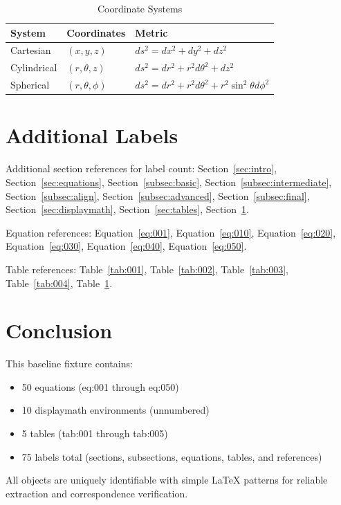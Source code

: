 \documentclass{article}
\begin{document}
\begin{table}[h]
\centering
\caption{Coordinate Systems}\label{tab:005}
\begin{tabular}{lll}
\hline
System & Coordinates & Metric \\
\hline
Cartesian & $(x, y, z)$ & $ds^2 = dx^2 + dy^2 + dz^2$ \\
Cylindrical & $(r, \theta, z)$ & $ds^2 = dr^2 + r^2d\theta^2 + dz^2$ \\
Spherical & $(r, \theta, \phi)$ & $ds^2 = dr^2 + r^2d\theta^2 + r^2\sin^2\theta d\phi^2$ \\
\hline
\end{tabular}
\end{table}

\section{Additional Labels}\label{sec:labels}

Additional section references for label count: Section~\ref{sec:intro}, Section~\ref{sec:equations}, Section~\ref{subsec:basic}, Section~\ref{subsec:intermediate}, Section~\ref{subsec:align}, Section~\ref{subsec:advanced}, Section~\ref{subsec:final}, Section~\ref{sec:displaymath}, Section~\ref{sec:tables}, Section~\ref{sec:labels}.

Equation references: Equation~\ref{eq:001}, Equation~\ref{eq:010}, Equation~\ref{eq:020}, Equation~\ref{eq:030}, Equation~\ref{eq:040}, Equation~\ref{eq:050}.

Table references: Table~\ref{tab:001}, Table~\ref{tab:002}, Table~\ref{tab:003}, Table~\ref{tab:004}, Table~\ref{tab:005}.

\section{Conclusion}\label{sec:conclusion}

This baseline fixture contains:
\begin{itemize}
\item 50 equations (eq:001 through eq:050)
\item 10 displaymath environments (unnumbered)
\item 5 tables (tab:001 through tab:005)
\item 75 labels total (sections, subsections, equations, tables, and references)
\end{itemize}

All objects are uniquely identifiable with simple LaTeX patterns for reliable extraction and correspondence verification.
\end{document}
